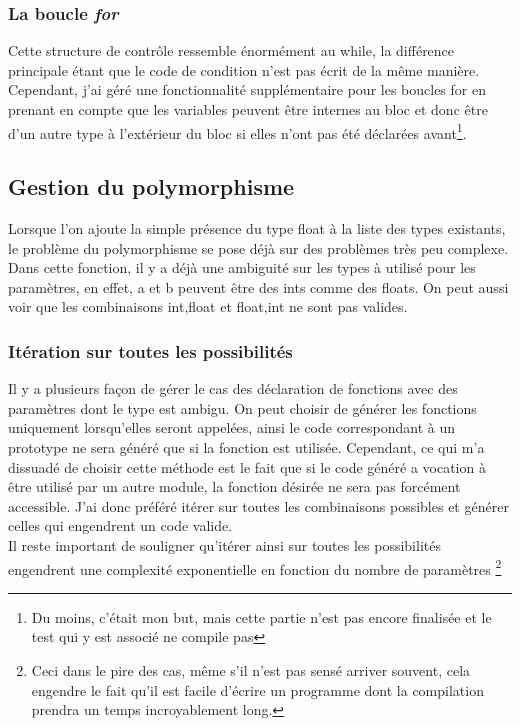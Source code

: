 \documentclass[12pt]{article}
\begin{document}
\subsubsection{La boucle \em{for}}
Cette structure de contrôle ressemble énormément au while, la différence
principale étant que le code de condition n'est pas écrit de la même manière.
Cependant, j'ai géré une fonctionnalité supplémentaire pour les boucles for
en prenant en compte que les variables peuvent être internes au bloc et donc
être d'un autre type à l'extérieur du bloc si elles n'ont pas été déclarées
avant\footnote{Du moins, c'était mon but, mais cette partie n'est pas
encore finalisée et le test qui y est associé ne compile pas}.

\subsection{Gestion du polymorphisme}
Lorsque l'on ajoute la simple présence du type float à la liste des types
existants, le problème du polymorphisme se pose déjà sur des problèmes très
peu complexe.
Dans cette fonction, il y a déjà une ambiguité sur les types à utilisé pour
les paramètres, en effet, a et b peuvent être des ints comme des floats. On
peut aussi voir que les combinaisons int,float et float,int ne sont pas
valides.

\subsubsection{Itération sur toutes les possibilités}
Il y a plusieurs façon de gérer le cas des déclaration de fonctions avec des
paramètres dont le type est ambigu. On peut choisir de générer les fonctions
uniquement lorsqu'elles seront appelées, ainsi le code correspondant à un
prototype ne sera généré que si la fonction est utilisée. Cependant, ce qui
m'a dissuadé de choisir cette méthode est le fait que si le code généré a
vocation à être utilisé par un autre module, la fonction désirée ne sera pas
forcément accessible. J'ai donc préféré itérer sur toutes les combinaisons
possibles et générer celles qui engendrent un code valide.\\

Il reste important de souligner qu'itérer ainsi sur toutes les possibilités
engendrent une complexité exponentielle en fonction du nombre de paramètres
\footnote{Ceci dans le pire des cas, même s'il n'est pas sensé arriver
souvent, cela engendre le fait qu'il est facile d'écrire un programme dont
la compilation prendra un temps incroyablement long.}
\end{document}
